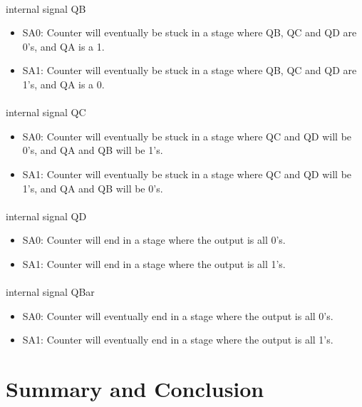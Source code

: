 \documentclass{article}
\begin{document}
	\paragraph{} internal signal QB
	\begin{itemize}
		\item SA0: Counter will eventually be stuck in a stage where QB, QC and QD are 0’s, and QA is a 1. 
		\item SA1: Counter will eventually be stuck in a stage where QB, QC and QD are 1’s, and QA is a 0.
	\end{itemize}

	\paragraph{} internal signal QC
	\begin{itemize}
		\item SA0: Counter will eventually be stuck in a stage where QC and QD will be 0’s, and QA and QB will be 1’s.
		\item SA1: Counter will eventually be stuck in a stage where QC and QD will be 1’s, and QA and QB will be 0’s. 
	\end{itemize}

	\paragraph{} internal signal QD
	\begin{itemize}
		\item SA0: Counter will end in a stage where the output is all 0’s.
		\item SA1: Counter will end in a stage where the output is all 1’s.
	\end{itemize}

	\paragraph{} internal signal QBar
	\begin{itemize}
		\item SA0: Counter will eventually end in a stage where the output is all 0’s.
		\item SA1: Counter will eventually end in a stage where the output is all 1’s.
	\end{itemize}



\section{Summary and Conclusion}
\end{document}
